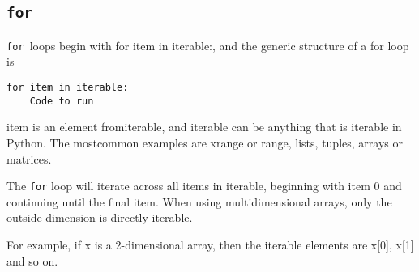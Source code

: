 \documentclass[Pydata.tex]{subfiles}
\begin{document}
\subsection{\texttt{for}}
\texttt{for }loops begin with for item in iterable:, and the generic structure of a for loop is
\begin{verbatim}
for item in iterable:
	Code to run
\end{verbatim}
item is an element fromiterable, and iterable can be anything that is iterable in Python. The mostcommon
examples are xrange or range, lists, tuples, arrays or matrices. 

The \texttt{for} loop will iterate across all items in
iterable, beginning with item 0 and continuing until the final item. When using multidimensional arrays,
only the outside dimension is directly iterable. 

For example, if x is a 2-dimensional array, then the iterable
elements are x[0], x[1] and so on.
\end{document}
